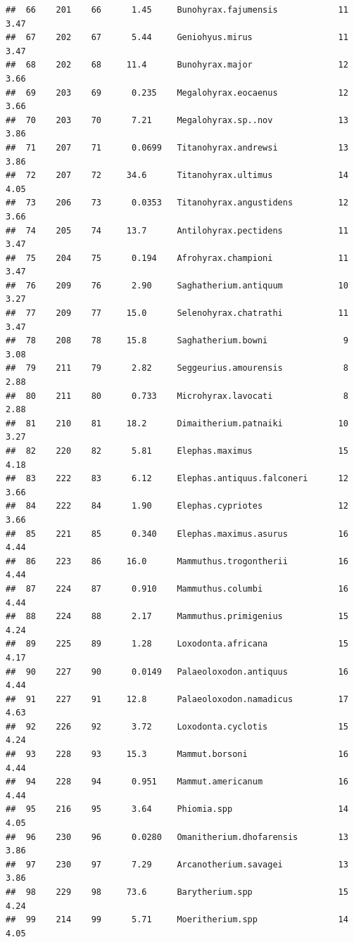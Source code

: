 \documentclass[10pt,letterpaper]{article}
\begin{document}
\begin{verbatim}
##  66    201    66      1.45     Bunohyrax.fajumensis            11    3.47 
##  67    202    67      5.44     Geniohyus.mirus                 11    3.47 
##  68    202    68     11.4      Bunohyrax.major                 12    3.66 
##  69    203    69      0.235    Megalohyrax.eocaenus            12    3.66 
##  70    203    70      7.21     Megalohyrax.sp..nov             13    3.86 
##  71    207    71      0.0699   Titanohyrax.andrewsi            13    3.86 
##  72    207    72     34.6      Titanohyrax.ultimus             14    4.05 
##  73    206    73      0.0353   Titanohyrax.angustidens         12    3.66 
##  74    205    74     13.7      Antilohyrax.pectidens           11    3.47 
##  75    204    75      0.194    Afrohyrax.championi             11    3.47 
##  76    209    76      2.90     Saghatherium.antiquum           10    3.27 
##  77    209    77     15.0      Selenohyrax.chatrathi           11    3.47 
##  78    208    78     15.8      Saghatherium.bowni               9    3.08 
##  79    211    79      2.82     Seggeurius.amourensis            8    2.88 
##  80    211    80      0.733    Microhyrax.lavocati              8    2.88 
##  81    210    81     18.2      Dimaitherium.patnaiki           10    3.27 
##  82    220    82      5.81     Elephas.maximus                 15    4.18 
##  83    222    83      6.12     Elephas.antiquus.falconeri      12    3.66 
##  84    222    84      1.90     Elephas.cypriotes               12    3.66 
##  85    221    85      0.340    Elephas.maximus.asurus          16    4.44 
##  86    223    86     16.0      Mammuthus.trogontherii          16    4.44 
##  87    224    87      0.910    Mammuthus.columbi               16    4.44 
##  88    224    88      2.17     Mammuthus.primigenius           15    4.24 
##  89    225    89      1.28     Loxodonta.africana              15    4.17 
##  90    227    90      0.0149   Palaeoloxodon.antiquus          16    4.44 
##  91    227    91     12.8      Palaeoloxodon.namadicus         17    4.63 
##  92    226    92      3.72     Loxodonta.cyclotis              15    4.24 
##  93    228    93     15.3      Mammut.borsoni                  16    4.44 
##  94    228    94      0.951    Mammut.americanum               16    4.44 
##  95    216    95      3.64     Phiomia.spp                     14    4.05 
##  96    230    96      0.0280   Omanitherium.dhofarensis        13    3.86 
##  97    230    97      7.29     Arcanotherium.savagei           13    3.86 
##  98    229    98     73.6      Barytherium.spp                 15    4.24 
##  99    214    99      5.71     Moeritherium.spp                14    4.05 

\end{verbatim}
\end{document}
